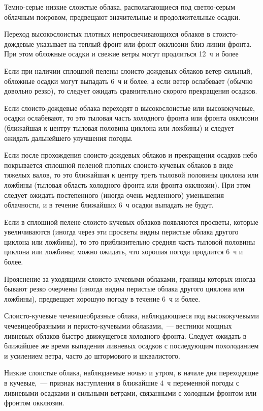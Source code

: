  Темно-серые низкие слоистые облака, располагающиеся под
светло-серым облачным покровом, предвещают значительные и
продолжительные осадки.

 Переход высокослоистых плотных непросвечивающихся облаков в
стоисто-дождевые указывает на теплый фронт или фронт окклюзии близ
линии фронта. При этом обложные осадки и свежие ветры могут продлиться
12~ч и более

 Если при наличии сплошной пелены слоисто-дождевых облаков ветер
сильный, обложные осадки могут выпадать 6~ч и более, а если ветер
ослабевает (обычно довольно резко), то следует ожидать сравнительно
скорого прекращения осадков.

 Если слоисто-дождевые облака переходят в высокослоистые или
высококучевые, осадки ослабевают, то это тыловая часть холодного
фронта или фронта окклюзии (ближайшая к центру тыловая половина
циклона или ложбины) и следует ожидать дальнейшего улучшения погоды.

 Если после прохождения слоисто-дождевых облаков и прекращения
осадков небо покрывается сплошной пеленой плотных слоисто-кучевых
облаков в виде тяжелых валов, то это ближайшая к центру треть тыловой
половины циклона или ложбины (тыловая область холодного фронта или
фронта окклюзии). При этом следует ожидать постепенного (иногда очень
медленного) уменьшения облачности, и в течение ближайших 6~ч
осадки выпадать не будут.

 Если в сплошной пелене слоисто-кучевых облаков появляются
просветы, которые увеличиваются (иногда через эти просветы видны
перистые облака другого циклона или ложбины), то это приблизительно
средняя часть тыловой половины циклона или ложбины; можно ожидать, что
хорошая погода продлится 6~ч и более.

 Прояснение за уходящими слоисто-кучевыми облаками, границы
которых иногда бывают резко очерчены (иногда видны перистые облака
другого циклона или ложбины), предвещает хорошую погоду в течение 6~ч
и более.

 Слоисто-кучевые чечевицеобразные облака, наблюдающиеся под
высококучевыми чечевицеобразными и перисто-кучевыми облаками,~---
вестники мощных ливневых облаков быстро движущегося холодного
фронта. Следует ожидать в ближайшее же время выпадения ливневых осадков
с последующим похолоданием и усилением ветра, часто до штормового и
шквалистого.

 Низкие слоистые облака, наблюдаемые ночью и утром, в начале дня
переходящие в кучевые,~--- признак наступления в ближайшие 4~ч
переменной погоды с ливневыми осадками и сильными ветрами, связанными
с холодным фронтом или фронтом окклюзии.

